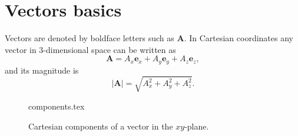\section{Vectors basics}

Vectors are denoted by boldface letters such as $\mathbf{A}$. In Cartesian coordinates any vector in
3-dimensional space can be written as
\begin{equation}
    \mathbf{A} = A_x \mathbf{e}_x + A_y \mathbf{e}_y + A_z \mathbf{e}_z,
\end{equation}
and its magnitude is
\begin{equation}
    |\mathbf{A}| = \sqrt{A_x^2 + A_y^2 + A_z^2}.
\end{equation}

\begin{figure}[htb]
    \centering
    {components.tex}
    \caption{Cartesian components of a vector in the $xy$-plane.}
    \label{fig:vec-components}
\end{figure}




